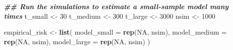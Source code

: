 \documentclass[
]{book}
\newenvironment{Shaded}{\begin{snugshade}}{\end{snugshade}}
\newcommand{\AttributeTok}[1]{\textcolor[rgb]{0.13,0.29,0.53}{#1}}
\newcommand{\ConstantTok}[1]{\textcolor[rgb]{0.56,0.35,0.01}{#1}}
\newcommand{\DecValTok}[1]{\textcolor[rgb]{0.00,0.00,0.81}{#1}}
\newcommand{\DocumentationTok}[1]{\textcolor[rgb]{0.56,0.35,0.01}{\textbf{\textit{#1}}}}
\newcommand{\FunctionTok}[1]{\textcolor[rgb]{0.13,0.29,0.53}{\textbf{#1}}}
\newcommand{\NormalTok}[1]{#1}
\newcommand{\OtherTok}[1]{\textcolor[rgb]{0.56,0.35,0.01}{#1}}
\begin{document}
\begin{Shaded}
\begin{Highlighting}[]
\DocumentationTok{\#\# Run the simulations to estimate a small{-}sample model many times}
\NormalTok{t\_small  }\OtherTok{\textless{}{-}} \DecValTok{30}
\NormalTok{t\_medium }\OtherTok{\textless{}{-}} \DecValTok{300}
\NormalTok{t\_large  }\OtherTok{\textless{}{-}} \DecValTok{3000}
\NormalTok{nsim }\OtherTok{\textless{}{-}} \DecValTok{1000}

\NormalTok{empirical\_risk }\OtherTok{\textless{}{-}} \FunctionTok{list}\NormalTok{(}
  \AttributeTok{model\_small =} \FunctionTok{rep}\NormalTok{(}\ConstantTok{NA}\NormalTok{, nsim),}
  \AttributeTok{model\_medium =} \FunctionTok{rep}\NormalTok{(}\ConstantTok{NA}\NormalTok{, nsim),}
  \AttributeTok{model\_large =} \FunctionTok{rep}\NormalTok{(}\ConstantTok{NA}\NormalTok{, nsim)}
\NormalTok{)}


\end{Highlighting}
\end{Shaded}
\end{document}
